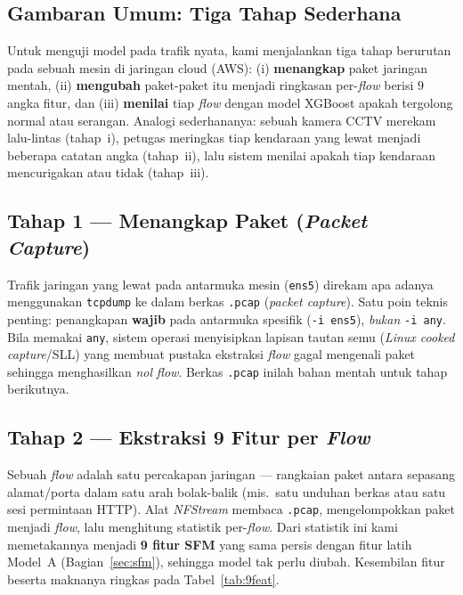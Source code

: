 \documentclass[11pt,a4paper]{article}
\begin{document}
\subsection{Gambaran Umum: Tiga Tahap Sederhana}
Untuk menguji model pada trafik nyata, kami menjalankan tiga tahap berurutan pada
sebuah mesin di jaringan cloud (AWS): (i) \textbf{menangkap} paket jaringan
mentah, (ii) \textbf{mengubah} paket-paket itu menjadi ringkasan per-\emph{flow}
berisi $9$ angka fitur, dan (iii) \textbf{menilai} tiap \emph{flow} dengan model
XGBoost apakah tergolong normal atau serangan. Analogi sederhananya: sebuah
kamera CCTV merekam lalu-lintas (tahap~i), petugas meringkas tiap kendaraan yang
lewat menjadi beberapa catatan angka (tahap~ii), lalu sistem menilai apakah tiap
kendaraan mencurigakan atau tidak (tahap~iii).

\subsection{Tahap 1 --- Menangkap Paket (\emph{Packet Capture})}
Trafik jaringan yang lewat pada antarmuka mesin (\texttt{ens5}) direkam apa adanya
menggunakan \texttt{tcpdump} ke dalam berkas \texttt{.pcap} (\emph{packet
capture}). Satu poin teknis penting: penangkapan \textbf{wajib} pada antarmuka
spesifik (\texttt{-i ens5}), \emph{bukan} \texttt{-i any}. Bila memakai
\texttt{any}, sistem operasi menyisipkan lapisan tautan semu (\emph{Linux cooked
capture}/SLL) yang membuat pustaka ekstraksi \emph{flow} gagal mengenali paket
sehingga menghasilkan \emph{nol} \emph{flow}. Berkas \texttt{.pcap} inilah bahan
mentah untuk tahap berikutnya.

\subsection{Tahap 2 --- Ekstraksi 9 Fitur per \emph{Flow}}
Sebuah \emph{flow} adalah satu percakapan jaringan --- rangkaian paket antara
sepasang alamat/porta dalam satu arah bolak-balik (mis.\ satu unduhan berkas atau
satu sesi permintaan HTTP). Alat \emph{NFStream} membaca \texttt{.pcap},
mengelompokkan paket menjadi \emph{flow}, lalu menghitung statistik per-\emph{flow}.
Dari statistik ini kami memetakannya menjadi \textbf{9 fitur SFM} yang sama persis
dengan fitur latih Model~A (Bagian~\ref{sec:sfm}), sehingga model tak perlu
diubah. Kesembilan fitur beserta maknanya ringkas pada
Tabel~\ref{tab:9feat}.
\end{document}
